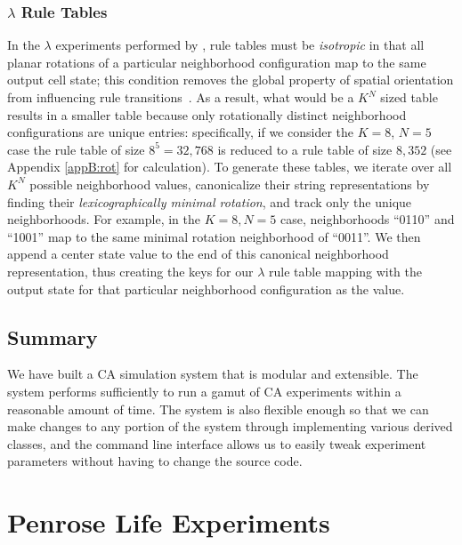 \documentclass[a4paper,11pt]{report}
\begin{document}
\subsection{$\lambda$ Rule Tables}
In the $\lambda$ experiments performed by \citeauthor{wo90}, rule tables must be \textit{isotropic} in that all planar rotations of a particular neighborhood configuration map to the same output cell state; this condition removes the global property of spatial orientation from influencing rule transitions~\cite{av00,wo90}. As a result, what would be a $K^N$ sized table results in a smaller table because only rotationally distinct neighborhood configurations are unique entries: specifically, if we consider the $K=8$, $N=5$ case the rule table of size $8^5 = 32,768$ is reduced to a rule table of size $8,352$ (see Appendix \ref{appB:rot} for calculation). To generate these tables, we iterate over all $K^N$ possible neighborhood values, canonicalize their string representations by finding their \textit{lexicographically minimal rotation}, and track only the unique neighborhoods. For example, in the $K=8, N=5$ case, neighborhoods ``0110'' and ``1001'' map to the same minimal rotation neighborhood of ``0011''. We then append a center state value to the end of this canonical neighborhood representation, thus creating the keys for our $\lambda$ rule table mapping with the output state for that particular neighborhood configuration as the value.

\section{Summary}
We have built a CA simulation system that is modular and extensible. The system performs sufficiently to run a gamut of CA experiments within a reasonable amount of time. The system is also flexible enough so that we can make changes to any portion of the system through implementing various derived classes, and the command line interface allows us to easily tweak experiment parameters without having to change the source code.

\processdelayedfloats

\chapter{Penrose Life Experiments}
\label{ch:penrose}
\end{document}

